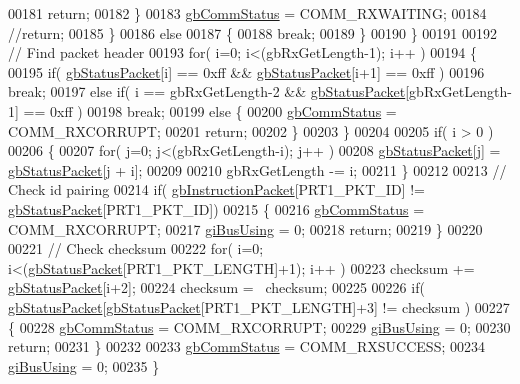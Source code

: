 \begin{DoxyCode}
00181                 \textcolor{keywordflow}{return};
00182             \}
00183             \hyperlink{a00004_a5b603f6bed7ccc595f1f50bd6a6ebbfc}{gbCommStatus} = COMM\_RXWAITING;
00184             \textcolor{comment}{//return;           }
00185         \}
00186         \textcolor{keywordflow}{else}
00187         \{
00188             \textcolor{keywordflow}{break};
00189         \}
00190     \}
00191 
00192     \textcolor{comment}{// Find packet header}
00193     \textcolor{keywordflow}{for}( i=0; i<(gbRxGetLength-1); i++ )
00194     \{
00195         \textcolor{keywordflow}{if}( \hyperlink{a00004_aa57c86d3bbbeaf5c9d4f6bd00376b04f}{gbStatusPacket}[i] == 0xff && \hyperlink{a00004_aa57c86d3bbbeaf5c9d4f6bd00376b04f}{gbStatusPacket}[i+1] == 0xff )
00196             \textcolor{keywordflow}{break};
00197         \textcolor{keywordflow}{else} \textcolor{keywordflow}{if}( i == gbRxGetLength-2 && \hyperlink{a00004_aa57c86d3bbbeaf5c9d4f6bd00376b04f}{gbStatusPacket}[gbRxGetLength-1] == 0xff )
00198             \textcolor{keywordflow}{break};
00199         \textcolor{keywordflow}{else} \{
00200             \hyperlink{a00004_a5b603f6bed7ccc595f1f50bd6a6ebbfc}{gbCommStatus} = COMM\_RXCORRUPT;
00201             \textcolor{keywordflow}{return};
00202         \}
00203     \}
00204 
00205     \textcolor{keywordflow}{if}( i > 0 )
00206     \{
00207         \textcolor{keywordflow}{for}( j=0; j<(gbRxGetLength-i); j++ )
00208             \hyperlink{a00004_aa57c86d3bbbeaf5c9d4f6bd00376b04f}{gbStatusPacket}[j] = \hyperlink{a00004_aa57c86d3bbbeaf5c9d4f6bd00376b04f}{gbStatusPacket}[j + i];
00209             
00210         gbRxGetLength -= i;     
00211     \}
00212 
00213     \textcolor{comment}{// Check id pairing}
00214     \textcolor{keywordflow}{if}( \hyperlink{a00004_afd94dcf01b8e96298727776e222de722}{gbInstructionPacket}[PRT1\_PKT\_ID] != \hyperlink{a00004_aa57c86d3bbbeaf5c9d4f6bd00376b04f}{gbStatusPacket}[PRT1\_PKT\_ID])
00215     \{
00216         \hyperlink{a00004_a5b603f6bed7ccc595f1f50bd6a6ebbfc}{gbCommStatus} = COMM\_RXCORRUPT;
00217         \hyperlink{a00004_ad10e0e49f5fef04bf789a89c14cc470a}{giBusUsing} = 0;
00218         \textcolor{keywordflow}{return};
00219     \}
00220     
00221     \textcolor{comment}{// Check checksum}
00222     \textcolor{keywordflow}{for}( i=0; i<(\hyperlink{a00004_aa57c86d3bbbeaf5c9d4f6bd00376b04f}{gbStatusPacket}[PRT1\_PKT\_LENGTH]+1); i++ )
00223         checksum += \hyperlink{a00004_aa57c86d3bbbeaf5c9d4f6bd00376b04f}{gbStatusPacket}[i+2];
00224     checksum = ~checksum;
00225 
00226     \textcolor{keywordflow}{if}( \hyperlink{a00004_aa57c86d3bbbeaf5c9d4f6bd00376b04f}{gbStatusPacket}[\hyperlink{a00004_aa57c86d3bbbeaf5c9d4f6bd00376b04f}{gbStatusPacket}[PRT1\_PKT\_LENGTH]+3] != checksum )
00227     \{
00228         \hyperlink{a00004_a5b603f6bed7ccc595f1f50bd6a6ebbfc}{gbCommStatus} = COMM\_RXCORRUPT;
00229         \hyperlink{a00004_ad10e0e49f5fef04bf789a89c14cc470a}{giBusUsing} = 0;
00230         \textcolor{keywordflow}{return};
00231     \}
00232     
00233     \hyperlink{a00004_a5b603f6bed7ccc595f1f50bd6a6ebbfc}{gbCommStatus} = COMM\_RXSUCCESS;
00234     \hyperlink{a00004_ad10e0e49f5fef04bf789a89c14cc470a}{giBusUsing} = 0;
00235 \}
\end{DoxyCode}
